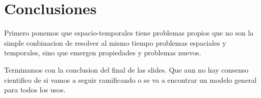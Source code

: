 \chapter{Conclusiones}  \label{cap:conc}

Primero ponemos que espacio-temporales tiene problemas propios que no son la simple conbinacion de resolver al mismo tiempo problemas espaciales y temporales, sino que emergen propiedades y problemas nuevos.

Terminamos con la conclusion del final de las slides. Que aun no hay consenso cientifico de si vamos a seguir ramificando o se va a encontrar un modelo general para todos los usos.
